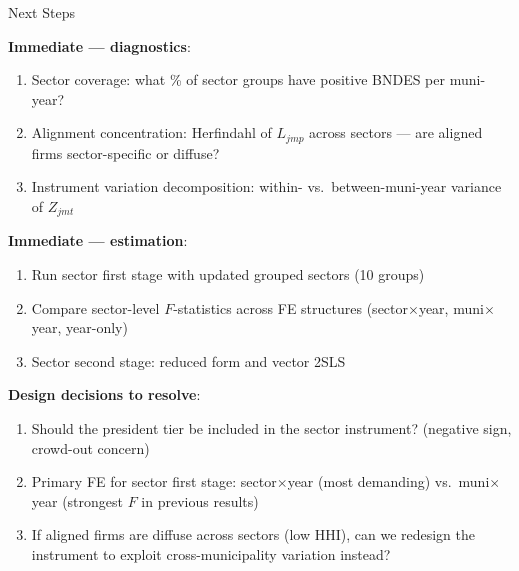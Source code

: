 \documentclass[aspectratio=169,11pt]{beamer}
\begin{document}
\begin{frame}{Next Steps}

\textbf{Immediate --- diagnostics}:
\begin{enumerate}
    \item Sector coverage: what \% of sector groups have positive BNDES per muni-year?
    \item Alignment concentration: Herfindahl of $L_{jmp}$ across sectors --- are aligned firms sector-specific or diffuse?
    \item Instrument variation decomposition: within- vs.\ between-muni-year variance of $Z_{jmt}$
\end{enumerate}

\bigskip

\textbf{Immediate --- estimation}:
\begin{enumerate}
    \item Run sector first stage with updated grouped sectors (10 groups)
    \item Compare sector-level $F$-statistics across FE structures (sector$\times$year, muni$\times$year, year-only)
    \item Sector second stage: reduced form and vector 2SLS
\end{enumerate}

\bigskip

\textbf{Design decisions to resolve}:
\begin{enumerate}
    \item Should the president tier be included in the sector instrument? (negative sign, crowd-out concern)
    \item Primary FE for sector first stage: sector$\times$year (most demanding) vs.\ muni$\times$year (strongest $F$ in previous results)
    \item If aligned firms are diffuse across sectors (low HHI), can we redesign the instrument to exploit cross-municipality variation instead?
\end{enumerate}

\end{frame}

\appendix
\end{document}
